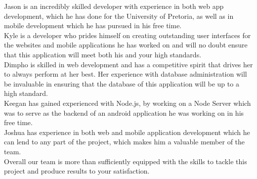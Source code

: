\documentclass[12pt]{article}
\begin{document}
	Jason is an incredibly skilled developer with experience in both web app development, which he has done for the University of Pretoria, as well as in mobile development which he has pursued in his free time.\\
	
	Kyle is a developer who prides himself on creating outstanding user interfaces for the websites and mobile applications he has worked on and will no doubt ensure that this application will meet both his and your high standards.\\
	
	Dimpho is skilled in web development and has a competitive spirit that drives her to always perform at her best. Her experience with database administration will be invaluable in ensuring that the database of this application will be up to a high standard.\\
	
	Keegan has gained experienced with Node.js, by working on a Node Server which was to serve as the backend of an android application he was working on in his free time.\\
	
	Joshua has experience in both web and mobile application development which he can lend to any part of the project, which makes him a valuable member of the team.\\
	
	Overall our team is more than sufficiently equipped with the skills to tackle this project and produce results to your satisfaction.\\
	
\end{document}
